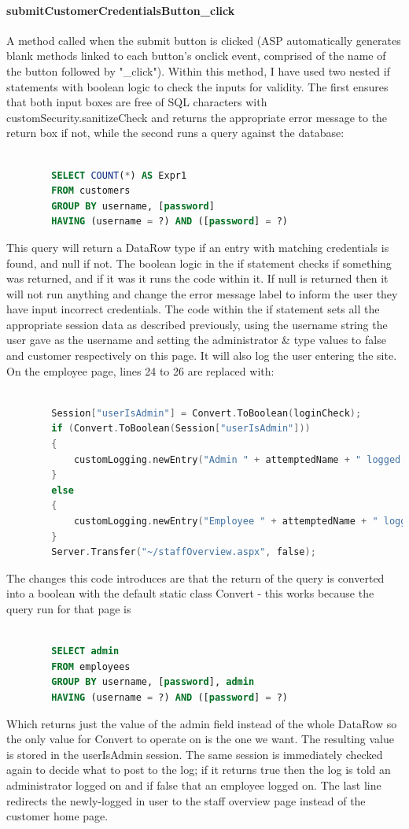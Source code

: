 ﻿\documentclass{article}
\begin{document}
    \paragraph{submitCustomerCredentialsButton\_click} A method called when the submit button is clicked (ASP automatically generates blank methods linked to each button's onclick event, comprised of the name of the button followed by "\_click").
    Within this method, I have used two nested if statements with boolean logic to check the inputs for validity.
    The first ensures that both input boxes are free of SQL characters with customSecurity.sanitizeCheck and returns the appropriate error message to the return box if not, while the second runs a query against the database:
    \begin{lstlisting}[language=SQL]

        SELECT COUNT(*) AS Expr1
        FROM customers
        GROUP BY username, [password]
        HAVING (username = ?) AND ([password] = ?)
    \end{lstlisting}
    This query will return a DataRow type if an entry with matching credentials is found, and null if not.
    The boolean logic in the if statement checks if something was returned, and if it was it runs the code within it.
    If null is returned then it will not run anything and change the error message label to inform the user they have input incorrect credentials.
    The code within the if statement sets all the appropriate session data as described previously, using the username string the user gave as the username and setting the administrator \& type values to false and customer respectively on this page.
    It will also log the user entering the site.
    On the employee page, lines 24 to 26 are replaced with:
    \begin{lstlisting}[language=C]

        Session["userIsAdmin"] = Convert.ToBoolean(loginCheck);
        if (Convert.ToBoolean(Session["userIsAdmin"]))
        {
            customLogging.newEntry("Admin " + attemptedName + " logged in");
        }
        else
        {
            customLogging.newEntry("Employee " + attemptedName + " logged in");
        }
        Server.Transfer("~/staffOverview.aspx", false);
    \end{lstlisting}
    The changes this code introduces are that the return of the query is converted into a boolean with the default static class Convert - this works because the query run for that page is
    \begin{lstlisting}[language=SQL]

        SELECT admin
        FROM employees
        GROUP BY username, [password], admin
        HAVING (username = ?) AND ([password] = ?)
    \end{lstlisting}
    Which returns just the value of the admin field instead of the whole DataRow so the only value for Convert to operate on is the one we want.
    The resulting value is stored in the userIsAdmin session.
    The same session is immediately checked again to decide what to post to the log; if it returns true then the log is told an administrator logged on and if false that an employee logged on.
    The last line redirects the newly-logged in user to the staff overview page instead of the customer home page.
    \newpage
\end{document}
